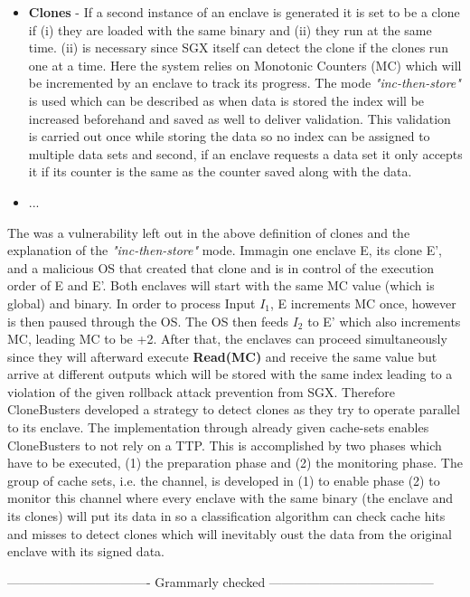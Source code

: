 \begin{itemize}
    \item \textbf{Clones} - If a second instance of an enclave is generated it is set to be a clone if (i) they are loaded with the same binary and (ii) they run at the same time. (ii) is necessary since SGX itself can detect the clone if the clones run one at a time. Here the system relies on Monotonic Counters (MC) which will be incremented by an enclave to track its progress. The mode \textit{"inc-then-store"} is used which can be described as when data is stored the index will be increased beforehand and saved as well to deliver validation. This validation is carried out once while storing the data so no index can be assigned to multiple data sets and second, if an enclave requests a data set it only accepts it if its counter is the same as the counter saved along with the data.
    \item ...
\end{itemize} 

The was a vulnerability left out in the above definition of clones and the explanation of the \textit{"inc-then-store"} mode. Immagin one enclave E, its clone E', and a malicious OS that created that clone and is in control of the execution order of E and E'. Both enclaves will start with the same MC value (which is global) and binary. In order to process Input \(I_1\), E increments MC once, however is then paused through the OS. The OS then feeds \(I_2\) to E' which also increments MC, leading MC to be +2. After that, the enclaves can proceed simultaneously since they will afterward execute \textbf{Read(MC)} and receive the same value but arrive at different outputs which will be stored with the same index leading to a violation of the given rollback attack prevention from SGX. Therefore CloneBusters developed a strategy to detect clones as they try to operate parallel to its enclave. The implementation through already given cache-sets enables CloneBusters to not rely on a TTP. This is accomplished by two phases which have to be executed, (1) the preparation phase and (2) the monitoring phase. The group of cache sets, i.e. the channel, is developed in (1) to enable phase (2) to monitor this channel where every enclave with the same binary (the enclave and its clones) will put its data in so a classification algorithm can check cache hits and misses to detect clones which will inevitably oust the data from the original enclave with its signed data.

---------------------------------- Grammarly checked ---------------------------------------
